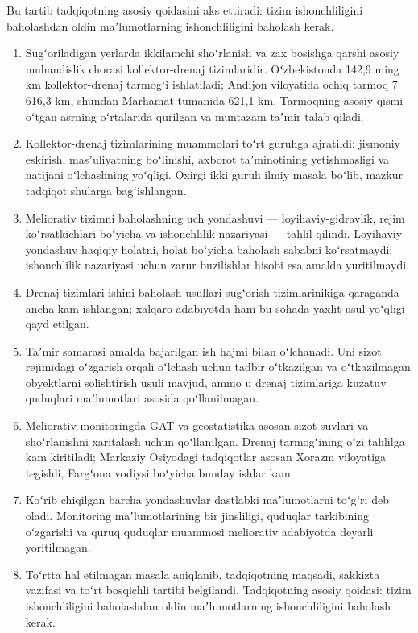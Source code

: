 Bu tartib tadqiqotning asosiy qoidasini aks ettiradi: tizim
ishonchliligini baholashdan oldin maʼlumotlarning ishonchliligini
baholash kerak.


\begin{enumerate}
\def\labelenumi{\arabic{enumi}.}
\tightlist
\item
  Sugʻoriladigan yerlarda ikkilamchi shoʻrlanish va zax bosishga qarshi
  asosiy muhandislik chorasi kollektor-drenaj tizimlaridir.
  Oʻzbekistonda 142,9 ming km kollektor-drenaj tarmogʻi ishlatiladi;
  Andijon viloyatida ochiq tarmoq 7 616,3 km, shundan Marhamat tumanida
  621,1 km. Tarmoqning asosiy qismi oʻtgan asrning oʻrtalarida qurilgan
  va muntazam taʼmir talab qiladi.
\item
  Kollektor-drenaj tizimlarining muammolari toʻrt guruhga ajratildi:
  jismoniy eskirish, masʼuliyatning boʻlinishi, axborot taʼminotining
  yetishmasligi va natijani oʻlchashning yoʻqligi. Oxirgi ikki guruh
  ilmiy masala boʻlib, mazkur tadqiqot shularga bagʻishlangan.
\item
  Meliorativ tizimni baholashning uch yondashuvi ---
  loyihaviy-gidravlik, rejim koʻrsatkichlari boʻyicha va ishonchlilik
  nazariyasi --- tahlil qilindi. Loyihaviy yondashuv haqiqiy holatni,
  holat boʻyicha baholash sababni koʻrsatmaydi; ishonchlilik nazariyasi
  uchun zarur buzilishlar hisobi esa amalda yuritilmaydi.
\item
  Drenaj tizimlari ishini baholash usullari sugʻorish tizimlarinikiga
  qaraganda ancha kam ishlangan; xalqaro adabiyotda ham bu sohada yaxlit
  usul yoʻqligi qayd etilgan.
\item
  Taʼmir samarasi amalda bajarilgan ish hajmi bilan oʻlchanadi. Uni
  sizot rejimidagi oʻzgarish orqali oʻlchash uchun tadbir oʻtkazilgan va
  oʻtkazilmagan obyektlarni solishtirish usuli mavjud, ammo u drenaj
  tizimlariga kuzatuv quduqlari maʼlumotlari asosida qoʻllanilmagan.
\item
  Meliorativ monitoringda GAT va geostatistika asosan sizot suvlari va
  shoʻrlanishni xaritalash uchun qoʻllanilgan. Drenaj tarmogʻining oʻzi
  tahlilga kam kiritiladi; Markaziy Osiyodagi tadqiqotlar asosan Xorazm
  viloyatiga tegishli, Fargʻona vodiysi boʻyicha bunday ishlar kam.
\item
  Koʻrib chiqilgan barcha yondashuvlar dastlabki maʼlumotlarni toʻgʻri
  deb oladi. Monitoring maʼlumotlarining bir jinsliligi, quduqlar
  tarkibining oʻzgarishi va quruq quduqlar muammosi meliorativ
  adabiyotda deyarli yoritilmagan.
\item
  Toʻrtta hal etilmagan masala aniqlanib, tadqiqotning maqsadi, sakkizta
  vazifasi va toʻrt bosqichli tartibi belgilandi. Tadqiqotning asosiy
  qoidasi: tizim ishonchliligini baholashdan oldin maʼlumotlarning
  ishonchliligini baholash kerak.
\end{enumerate}

